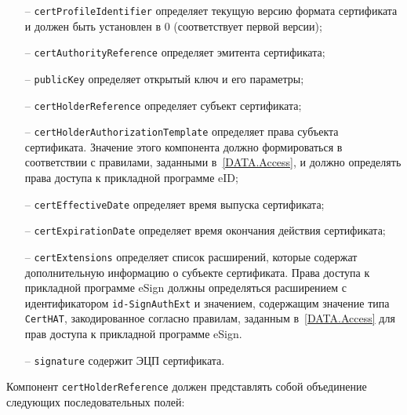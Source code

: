 \begin{itemize}
\item[--]
\verb|certProfileIdentifier| 
определяет текущую версию формата сертификата и 
должен быть установлен в 0 (соответствует первой версии); 

\item[--] 
\verb|certAuthorityReference| определяет эмитента сертификата;

\item[--]
\verb|publicKey| определяет открытый ключ и его параметры;

\item[--]
\verb|certHolderReference| определяет субъект сертификата;

\item[--]
\verb|certHolderAuthorizationTemplate| определяет права субъекта сертификата. 
Значение этого компонента должно формироваться в 
соответствии с правилами, заданными в~\ref{DATA.Access}, 
и должно определять права доступа к прикладной программе eID;

\item[--]
\verb|certEffectiveDate| определяет время выпуска сертификата;

\item[--]
\verb|certExpirationDate| определяет время окончания действия сертификата;

\item[--]
\verb|certExtensions| определяет список расширений, которые содержат 
дополнительную информацию о субъекте сертификата. 
Права доступа к прикладной программе 
eSign должны определяться расширением с идентификатором
\verb|id-SignAuthExt| и значением, содержащим 
значение типа \verb|CertHAT|, закодированное 
согласно правилам, заданным в~\ref{DATA.Access}
для прав доступа к прикладной программе eSign.

\item[--]
\verb|signature| содержит ЭЦП сертификата.
\end{itemize}

Компонент \verb|certHolderReference| должен представлять собой объединение 
следующих последовательных полей: 

